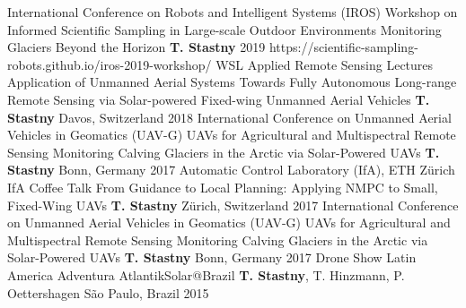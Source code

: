 \label{sec:talks}

\begin{cventries}

\cvtalkentry
	{International Conference on Robots and Intelligent Systems (IROS)} %
	{Workshop on Informed Scientific Sampling in Large-scale Outdoor Environments} %
	{Monitoring Glaciers Beyond the Horizon} %
	{\textbf{T. Stastny}} %
	{} %
	{2019} %
	{https://scientific-sampling-robots.github.io/iros-2019-workshop/} %
%
\cvtalkentry
	{WSL Applied Remote Sensing Lectures} %
	{Application of Unmanned Aerial Systems} %
	{Towards Fully Autonomous Long-range Remote Sensing via Solar-powered Fixed-wing Unmanned Aerial Vehicles} %
	{\textbf{T. Stastny}} %
	{Davos, Switzerland} %
	{2018} %
	{} %
%
\cvtalkentry
	{International Conference on Unmanned Aerial Vehicles in Geomatics (UAV-G)} %
	{UAVs for Agricultural and Multispectral Remote Sensing} %
	{Monitoring Calving Glaciers in the Arctic via Solar-Powered UAVs} %
	{\textbf{T. Stastny}} %
	{Bonn, Germany} %
	{2017} %
	{} %
%		
\cvtalkentry
	{Automatic Control Laboratory (IfA), ETH Z\"{u}rich} %
	{IfA Coffee Talk} %
	{From Guidance to Local Planning: Applying NMPC to Small, Fixed-Wing UAVs} %
	{\textbf{T. Stastny}} %
	{Z\"{u}rich, Switzerland} %
	{2017} %
	{} %
%
\cvtalkentry
	{International Conference on Unmanned Aerial Vehicles in Geomatics (UAV-G)} %
	{UAVs for Agricultural and Multispectral Remote Sensing} %
	{Monitoring Calving Glaciers in the Arctic via Solar-Powered UAVs} %
	{\textbf{T. Stastny}} %
	{Bonn, Germany} %
	{2017} %
	{} %
%		
\cvtalkentry
	{Drone Show Latin America} %
	{} %
	{Adventura AtlantikSolar@Brazil} %
	{\textbf{T. Stastny}, T. Hinzmann, P. Oettershagen} %
	{S\~{a}o Paulo, Brazil} %
	{2015} %
	{} %
%
\end{cventries}
